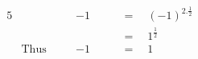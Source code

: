 \begin{alignat*}{5}
&\,&&-1\quad&&\,=\quad(-1)^{2.\frac{1}{2}}\\
&\,&&\quad&&\,=\quad1^\frac{1}{2}\\
&\text{Thus}\quad&&-1\quad&&\,=\quad1
\end{alignat*}
